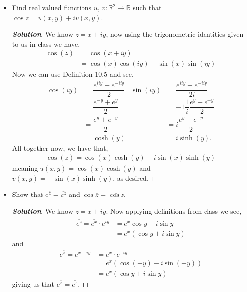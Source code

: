 \documentclass[11pt]{article}
\newenvironment{problem}[2][Problem\!]{\begin{trivlist}
\item[\hskip \labelsep {\bfseries #1}\hskip \labelsep {\bfseries #2}]}{\end{trivlist}}
\newenvironment{solution}{\begin{proof}[\textbf{\textit{Solution}}] }{\end{proof}}
\newcommand{\rr}{\mathbb R}   %
\newcommand{\conj}[1]{\overline{#1}}
\begin{document}
\newpage  %

\begin{problem}{5.2}\hfill
\begin{itemize}[itemsep=3em]
\item[(a)] Find real valued functions $u,\, v : \rr^2 \to \rr$ such that $\cos z = u(x, y) + iv(x, y)$.
\begin{solution}
  We know $z = x + iy$, now using the trigonometric identities given to us in class we have,
  \begin{align*}
    \cos(z) &= \cos(x + i y) \\
    &= \cos(x)\cos(i y) - \sin(x)\sin(i y)
  \end{align*}
  Now we can use Definition 10.5 and see,
  \begin{align*}
    \cos(i y) &= \dfrac{e^{i i y} + e^{- i i y}}{2}   & \sin(i y) &= \dfrac{e^{i i y} - e^{- i i y}}{2i} \\
    &= \dfrac{e^{-y} + e^{y}}{2} & &= -1 \dfrac{1}{i}\dfrac{e^{y} - e^{-y}}{2} \\
    &= \dfrac{e^{y} + e^{-y}}{2} & &= i \dfrac{e^{y} - e^{-y}}{2} \\
    &= \cosh(y) & &= i\sinh(y).
  \end{align*}
  All together now, we have that,
  \begin{align*}
    \cos(z) = \cos(x)\cosh(y) - i \sin(x)\sinh(y)
  \end{align*}
  meaning $u(x,y) = \cos(x)\cosh(y)$ and $v(x,y) = -\sin(x)\sinh(y)$, as desired.
\end{solution}

\item[(b)] Show that $e^{\overline{z}} = \overline{e^z}$ and $\cos\overline{z} = \overline{\cos z}$.
\begin{solution}
  We know $z = x + i y$. Now applying definitions from class we see,
  \begin{align*}
    \conj{e^{z}} = \conj{e^{x}}\cdot \conj{e^{i y}} &= e^{x}\conj{\cos y - i \sin y} \\
    &= e^{x}(\cos y + i\sin y)
  \end{align*}
  and 
  \begin{align*}
    e^{\conj z} = e^{x - i y} &= e^{x} \cdot e^{ -i y} \\
    &= e^{x} (\cos(-y) - i \sin(-y)) \\
    &= e^{x}( \cos y + i\sin y)
  \end{align*}
  giving us that $e^{\conj z} = \conj{e^{z}}$.


\end{solution}
\end{itemize}
\end{problem}
\end{document}
